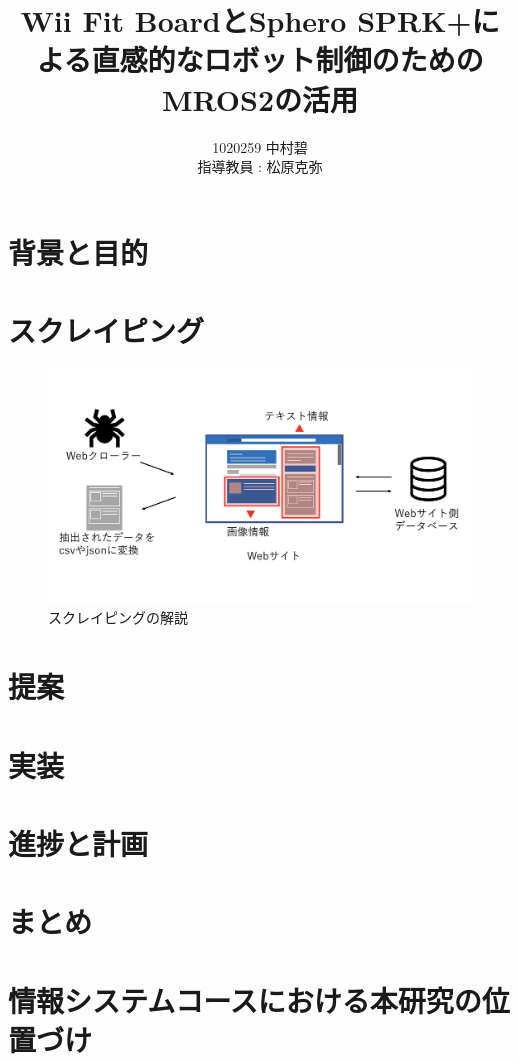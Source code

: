 \documentclass[11pt]{ujarticle}
\author{%
1020259 中村碧\\指導教員 : 松原克弥
}
\title{Wii Fit BoardとSphero SPRK+による直感的なロボット制御のためのMROS2の活用}
\begin{document}
\maketitle

\section{背景と目的}



\section{スクレイピング}


\begin{figure}[h]
	\includegraphics[width=0.9\linewidth]{./src/selenium.png}
	\caption{スクレイピングの解説}
  \label{fig:arch}
\end{figure}

\section{提案}



\section{実装}


\section{進捗と計画}


\section{まとめ}


\section{情報システムコースにおける本研究の位置づけ}
\end{document}
